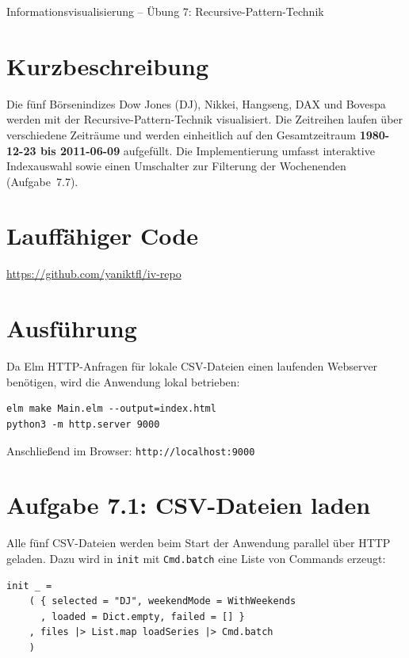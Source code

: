 \documentclass[11pt,a4paper]{article}
\begin{document}
\begin{center}
    {\Large Informationsvisualisierung -- Übung 7: Recursive-Pattern-Technik}
\end{center}

\section*{Kurzbeschreibung}

Die fünf Börsenindizes Dow Jones (DJ), Nikkei, Hangseng, DAX und Bovespa
werden mit der Recursive-Pattern-Technik visualisiert. Die Zeitreihen laufen
über verschiedene Zeiträume und werden einheitlich auf den Gesamtzeitraum
\textbf{1980-12-23 bis 2011-06-09} aufgefüllt. Die Implementierung umfasst
interaktive Indexauswahl sowie einen Umschalter zur Filterung der Wochenenden
(Aufgabe~7.7).

\section*{Lauffähiger Code}

\href{https://github.com/yaniktfl/iv-repo}{https://github.com/yaniktfl/iv-repo}

\section*{Ausführung}

Da Elm HTTP-Anfragen für lokale CSV-Dateien einen laufenden Webserver
benötigen, wird die Anwendung lokal betrieben:

\begin{verbatim}
elm make Main.elm --output=index.html
python3 -m http.server 9000
\end{verbatim}

Anschließend im Browser: \texttt{http://localhost:9000}

\section*{Aufgabe 7.1: CSV-Dateien laden}

Alle fünf CSV-Dateien werden beim Start der Anwendung parallel über HTTP
geladen. Dazu wird in \texttt{init} mit \texttt{Cmd.batch} eine Liste von
Commands erzeugt:

\begin{verbatim}
init _ =
    ( { selected = "DJ", weekendMode = WithWeekends
      , loaded = Dict.empty, failed = [] }
    , files |> List.map loadSeries |> Cmd.batch
    )
\end{verbatim}
\end{document}
